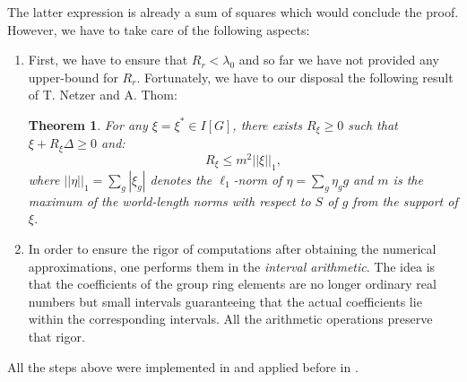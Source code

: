 \documentclass[12pt]{amsart}
\newtheorem{theorem}{Theorem}[section]
\theoremstyle{definition}
\numberwithin{figure}{section}
\numberwithin{table}{section}
\numberwithin{equation}{section}
\begin{document}
The latter expression is already a sum of squares which would conclude the proof. However, we have to take care of the following aspects:
\begin{enumerate}
    \item First, we have to ensure that $R_r<\lambda_0$ and so far we have not provided any upper-bound for $R_r$. Fortunately, we have to our disposal the following result of T. Netzer and A. Thom:
\begin{theorem}\label{theorem:netzer_thom}\cite[Lemma 2.1]{MR3359223}
    For any $\xi=\xi^*\in I[G]$, there exists $R_{\xi}\geq 0$ such that $\xi+R_{\xi}\Delta\geq 0$ and:
    $$
    R_{\xi}\leq m^2||\xi||_1,
    $$
    where $||\eta||_1=\sum_g|\xi_g|$ denotes the $\ell_1$-norm of $\eta=\sum_g\eta_gg$ and $m$ is the maximum of the world-length norms with respect to $S$ of $g$ from the support of $\xi$.
\end{theorem}

\item In order to ensure the rigor of computations after obtaining the numerical approximations, one performs them in the \emph{interval arithmetic}. The idea is that the coefficients of the group ring elements are no longer ordinary real numbers but small intervals guaranteeing that the actual coefficients lie within the corresponding intervals. All the arithmetic operations preserve that rigor.
\end{enumerate}

All the steps above were implemented in \cite{kaluba_PropertyTjl_2024} and applied before in \cite{MR3794918,MR4023374,MR4224715,MR4912919}.
\end{document}
